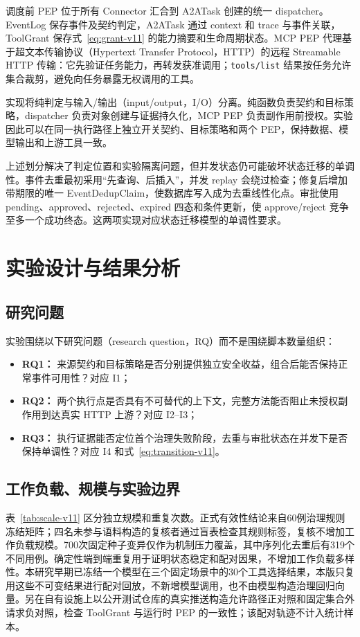 调度前 PEP 位于所有 Connector 汇合到 A2ATask 创建的统一 dispatcher。EventLog 保存事件及契约判定，A2ATask 通过 context 和 trace 与事件关联，ToolGrant 保存式~\eqref{eq:grant-v11} 的能力摘要和生命周期状态。MCP PEP 代理基于超文本传输协议（Hypertext Transfer Protocol，HTTP）的远程 Streamable HTTP 传输：它先验证任务能力，再转发获准调用；\texttt{tools/list} 结果按任务允许集合裁剪，避免向任务暴露无权调用的工具。

实现将纯判定与输入/输出（input/output，I/O）分离。纯函数负责契约和目标策略，dispatcher 负责对象创建与证据持久化，MCP PEP 负责副作用前授权。实验因此可以在同一执行路径上独立开关契约、目标策略和两个 PEP，保持数据、模型输出和上游工具一致。

上述划分解决了判定位置和实验隔离问题，但并发状态仍可能破坏状态迁移的单调性。事件去重最初采用“先查询、后插入”，并发 replay 会绕过检查；修复后增加带期限的唯一 EventDedupClaim，使数据库写入成为去重线性化点。审批使用 pending、approved、rejected、expired 四态和条件更新，使 approve/reject 竞争至多一个成功终态。这两项实现对应状态迁移模型的单调性要求。

\section{实验设计与结果分析}\label{sec:evaluation-v11}

\subsection{研究问题}

实验围绕以下研究问题（research question，RQ）而不是围绕脚本数量组织：
\begin{itemize}
  \item \textbf{RQ1：} 来源契约和目标策略是否分别提供独立安全收益，组合后能否保持正常事件可用性？对应 I1；
  \item \textbf{RQ2：} 两个执行点是否具有不可替代的上下文，完整方法能否阻止未授权副作用到达真实 HTTP 上游？对应 I2--I3；
  \item \textbf{RQ3：} 执行证据能否定位首个治理失败阶段，去重与审批状态在并发下是否保持单调性？对应 I4 和式~\eqref{eq:transition-v11}。
\end{itemize}

\subsection{工作负载、规模与实验边界}

表~\ref{tab:scale-v11} 区分独立规模和重复次数。正式有效性结论来自60例治理规则冻结矩阵；四名未参与语料构造的复核者通过盲表检查其规则标签，复核不增加工作负载规模。700次固定种子变异仅作为机制压力覆盖，其中序列化去重后有319个不同用例。确定性端到端重复用于证明状态稳定和配对因果，不增加工作负载多样性。本研究早期已冻结一个模型在三个固定场景中的30个工具选择结果，本版只复用这些不可变结果进行配对回放，不新增模型调用，也不由模型构造治理回归向量。另在自有设施上以公开测试仓库的真实推送构造允许路径正对照和固定集合外请求负对照，检查 ToolGrant 与运行时 PEP 的一致性；该配对轨迹不计入统计样本。

